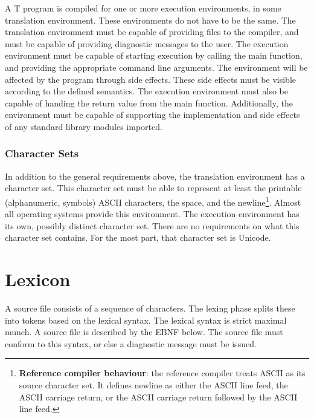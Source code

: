 \documentclass[letterpaper,12pt]{book}
\begin{document}
A T program is compiled for one or more execution environments, in some translation environment. These environments do not have to be the same. The translation environment must be capable of providing files to the compiler, and must be capable of providing diagnostic messages to the user. The execution environment must be capable of starting execution by calling the main function, and providing the appropriate command line arguments. The environment will be affected by the program through side effects. These side effects must be visible according to the defined semantics. The execution environment must also be capable of handing the return value from the main function. Additionally, the environment must be capable of supporting the implementation and side effects of any standard library modules imported.

\subsection{Character Sets}

In addition to the general requirements above, the translation environment has a character set. This character set must be able to represent at least the printable (alphanumeric, symbols) ASCII characters, the space, and the newline\footnote{\textbf{Reference compiler behaviour}: the reference compiler treats ASCII as its source character set. It defines newline as either the ASCII line feed, the ASCII carriage return, or the ASCII carriage return followed by the ASCII line feed.}. Almost all operating systems provide this environment. The execution environment has its own, possibly distinct character set. There are no requirements on what this character set contains. For the most part, that character set is Unicode.

\chapter{Lexicon}

A source file consists of a sequence of characters. The lexing phase splits these into tokens based on the lexical syntax. The lexical syntax is strict maximal munch. A source file is described by the EBNF below. The source file must conform to this syntax, or else a diagnostic message must be issued.
\end{document}
